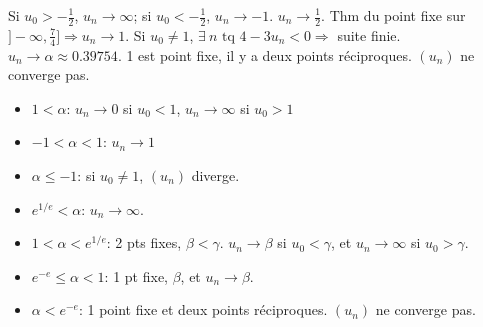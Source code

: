 {\begin{enumerate}
{Si $u_0 > {\scriptstyle-}\frac12$, $u_n\to\infty$;
             si $u_0 < {\scriptstyle-}\frac12$, $u_n\to-1$.
$u_n\to\frac12$.
Thm du point fixe sur $]-\infty, \frac74]  \Rightarrow  u_n\to 1$.
Si $u_0\ne 1$, $\exists\ n \text{ tq } 4-3u_n < 0  \Rightarrow $ suite finie.
$u_n\to\alpha \approx 0.39754$.
1 est point fixe, il y a deux points réciproques. $(u_n)$ ne converge pas.
\begin{itemize}
\item $1 < \alpha$: $u_n\to0$ si $u_0<1$, $u_n\to\infty$ si $u_0>1$
\item $-1 < \alpha <1$: $u_n\to 1$
\item $\alpha \le -1$: si $u_0 \ne 1$, $(u_n)$ diverge.
    	\end{itemize}
\begin{itemize}
\item $e^{1/e}  < \alpha$: $u_n\to\infty$.
\item $1 < \alpha < e^{1/e}$: 2 pts fixes, $\beta<\gamma$. $u_n\to\beta$ si $u_0<\gamma$, 
       et $u_n\to\infty$ si $u_0>\gamma$. 
\item $e^{-e} \le \alpha <  1$: 1 pt fixe, $\beta$, et $u_n\to\beta$.
\item $\alpha <  e^{-e}$: 1 point fixe et deux points réciproques. $(u_n)$ ne converge pas.
    	\end{itemize}
}
\end{enumerate}
}
